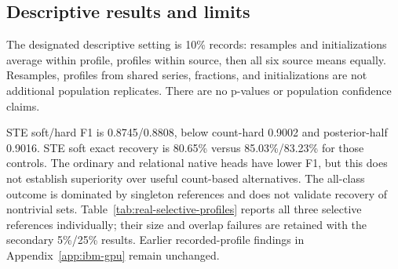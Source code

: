 \subsection{Descriptive results and limits}
The designated descriptive setting is 10\% records: resamples and initializations average within profile, profiles within source, then all six source means equally. Resamples, profiles from shared series, fractions, and initializations are not additional population replicates. There are no p-values or population confidence claims.

\begin{table}[ht]\centering\scriptsize

\caption{Whole-source held-out human-profile reconstruction at 10\% records. F1, exact recovery (\%), precision, recall, and cardinalities are equally weighted source macro means. All 36 references are included, of which 33 are singletons. Hard uses a majority decoder; soft/head/posterior inclusion cutoffs are development-selected; posterior-half and GFM are native decisions. No formal tests are performed.}\label{tab:real-learning-primary}
\end{table}

STE soft/hard F1 is 0.8745/0.8808, below count-hard 0.9002 and posterior-half 0.9016. STE soft exact recovery is 80.65\% versus 85.03\%/83.23\% for those controls. The ordinary and relational native heads have lower F1, but this does not establish superiority over useful count-based alternatives. The all-class outcome is dominated by singleton references and does not validate recovery of nontrivial sets. Table~\ref{tab:real-selective-profiles} reports all three selective references individually; their size and overlap failures are retained with the secondary 5\%/25\% results. Earlier recorded-profile findings in Appendix~\ref{app:ibm-gpu} remain unchanged.

\begin{table}[ht]\centering\scriptsize

\caption{All three selective human references at 10\% records: ERS A ($n=11$), ERS B ($n=4$), and Oakland ($n=8$), each with reference size three. Rows average eight shared resamples; learned readouts additionally average three initializations. These descriptive profile-level outcomes are not independent population replications. All methods and other fractions remain in the retained outputs.}\label{tab:real-selective-profiles}
\end{table}

